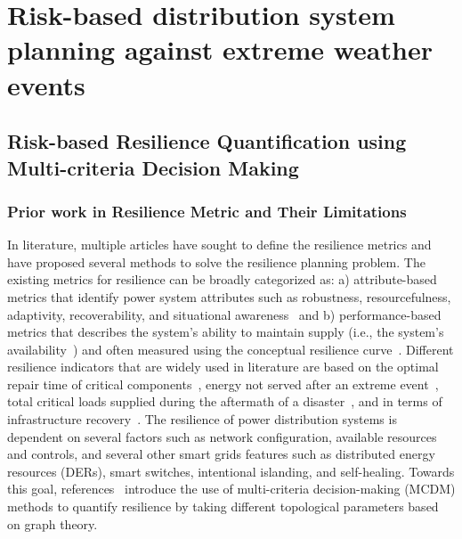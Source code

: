 \documentclass[hidelinks, 12pt]{article}
\begin{document}
\section{Risk-based distribution system planning against extreme weather events} 

\subsection{Risk-based Resilience Quantification using Multi-criteria Decision Making}
\subsubsection{Prior work in Resilience Metric and Their Limitations}

In literature, multiple articles have sought to define the resilience metrics and have proposed several methods to solve the resilience planning problem. The existing metrics for resilience can be broadly categorized as: a) attribute-based metrics that identify power system attributes such as robustness, resourcefulness, adaptivity, recoverability, and situational awareness~\cite{kandaperumal2020resilience} and b) performance-based metrics that describes the system's ability to maintain supply (i.e., the system's availability~\cite{cai2018availability}) and often measured using the conceptual resilience curve~\cite{panteli2017power}. 
Different resilience indicators that are widely used in literature are based on the optimal repair time of critical components~\cite{wen2020resilience}, energy not served after an extreme event~\cite{espinoza2017seismic}, total critical loads supplied during the aftermath of a disaster~\cite{poudel2018critical}, and  in terms of infrastructure recovery~\cite{umunnakwe2021quantitative}. 
The resilience of power distribution systems is dependent on several factors such as network configuration, available resources and controls, and several other smart grids features such as distributed energy resources (DERs), smart switches, intentional islanding, and self-healing. Towards this goal, references~\cite{7728107, chanda2016defining} introduce the use of multi-criteria decision-making (MCDM) methods to quantify resilience by taking different topological parameters based on graph theory.
\end{document}
